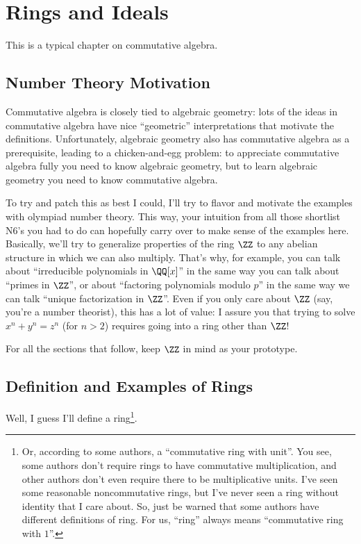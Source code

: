 \chapter{Rings and Ideals}
This is a typical chapter on commutative algebra.

\section{Number Theory Motivation}
Commutative algebra is closely tied to algebraic geometry:
lots of the ideas in commutative algebra have nice ``geometric'' interpretations that motivate the definitions.
Unfortunately, algebraic geometry also has commutative algebra as a prerequisite, leading to a
chicken-and-egg problem: to appreciate commutative algebra fully you need to know algebraic geometry,
but to learn algebraic geometry you need to know commutative algebra.

To try and patch this as best I could, I'll try to flavor and motivate the examples with olympiad number theory.
This way, your intuition from all those shortlist N6's
you had to do can hopefully carry over to make sense of the examples here.
Basically, we'll try to generalize properties of the ring $\ZZ$ to
any abelian structure in which we can also multiply.
That's why, for example, you can talk about ``irreducible polynomials in $\QQ[x]$'' in the same
way you can talk about ``primes in $\ZZ$'', or about ``factoring polynomials modulo $p$''
in the same way we can talk ``unique factorization in $\ZZ$''.
Even if you only care about $\ZZ$ (say, you're a number theorist), this has a lot of value:
I assure you that trying to solve $x^n+y^n = z^n$ (for $n > 2$) requires going into a ring other than $\ZZ$!

For all the sections that follow, keep $\ZZ$ in mind as your prototype.

\section{Definition and Examples of Rings}

Well, I guess I'll define a ring\footnote{%
	Or, according to some authors, a ``commutative ring with unit''.
	You see, some authors don't require rings to have commutative multiplication,
	and other authors don't even require there to be multiplicative units.
	I've seen some reasonable noncommutative rings, but I've never seen a ring
	without identity that I care about. So, just be warned that some authors
	have different definitions of ring.
	For us, ``ring'' always means ``commutative ring with $1$''.}.

